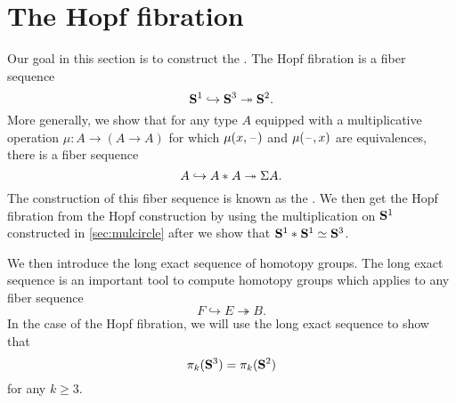 \section{The Hopf fibration}

Our goal in this section is to construct the . The Hopf fibration is a fiber sequence
\begin{equation*}
\mathbf{S}^{1}\hookrightarrow\mathbf{S}^{3}\twoheadrightarrow\mathbf{S}^{2}.
\end{equation*}
More generally, we show that for any type $A$ equipped with a multiplicative operation $\mu:A\to (A\to A)$ for which $\mu(x,\mathord{\hspace{1pt}\text{--}\hspace{1pt}})$ and $\mu(\mathord{\hspace{1pt}\text{--}\hspace{1pt}},x)$ are equivalences, there is a fiber sequence
\begin{equation*}
  A\hookrightarrow {A}\ast_{}{A}\twoheadrightarrow \Sigma A.
\end{equation*}
The construction of this fiber sequence is known as the . We then get the Hopf fibration from the Hopf construction by using the multiplication on $\mathbf{S}^{1}$ constructed in \cref{sec:mulcircle} after we show that $\eqv{\join{\sphere{1}}{\sphere{1}}}{\sphere{3}}$.

We then introduce the long exact sequence of homotopy groups. The long exact sequence is an important tool to compute homotopy groups which applies to any fiber sequence
\begin{equation*}
  F \hookrightarrow E \twoheadrightarrow B.
\end{equation*}
In the case of the Hopf fibration, we will use the long exact sequence to show that
\begin{equation*}
  \pi_k(\mathbf{S}^{3})=\pi_k(\mathbf{S}^{2})
\end{equation*}
for any $k\geq 3$.

